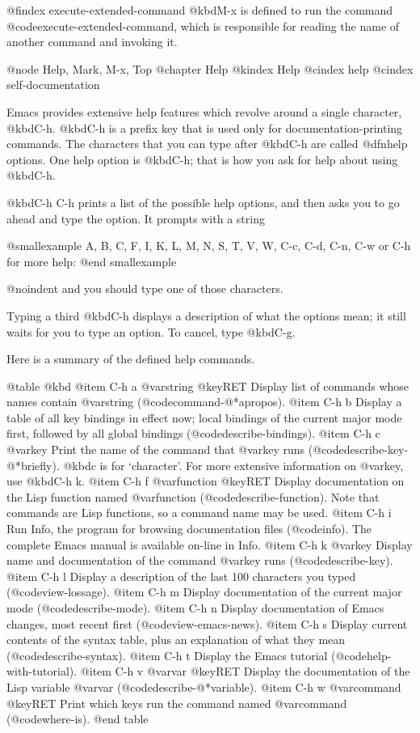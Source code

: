 {{{{{{@findex execute-extended-command
  @kbd{M-x} is defined to run the command @code{execute-extended-command},
which is responsible for reading the name of another command and invoking
it.

@node Help, Mark, M-x, Top
@chapter Help
@kindex Help
@cindex help
@cindex self-documentation

  Emacs provides extensive help features which revolve around a single
character, @kbd{C-h}.  @kbd{C-h} is a prefix key that is used only for
documentation-printing commands.  The characters that you can type after
@kbd{C-h} are called @dfn{help options}.  One help option is @kbd{C-h};
that is how you ask for help about using @kbd{C-h}.

  @kbd{C-h C-h} prints a list of the possible help options, and then asks
you to go ahead and type the option.  It prompts with a string

@smallexample
A, B, C, F, I, K, L, M, N, S, T, V, W, C-c, C-d, C-n, C-w or C-h for more help:
@end smallexample

@noindent
and you should type one of those characters.

  Typing a third @kbd{C-h} displays a description of what the options mean;
it still waits for you to type an option.  To cancel, type @kbd{C-g}.

  Here is a summary of the defined help commands.

@table @kbd
@item C-h a @var{string} @key{RET}
Display list of commands whose names contain @var{string}
(@code{command-@*apropos}).
@item C-h b
Display a table of all key bindings in effect now; local bindings of
the current major mode first, followed by all global bindings
(@code{describe-bindings}).
@item C-h c @var{key}
Print the name of the command that @var{key} runs (@code{describe-key-@*briefly}).
@kbd{c} is for `character'.  For more extensive information on @var{key},
use @kbd{C-h k}.
@item C-h f @var{function} @key{RET}
Display documentation on the Lisp function named @var{function}
(@code{describe-function}).  Note that commands are Lisp functions, so
a command name may be used.
@item C-h i
Run Info, the program for browsing documentation files (@code{info}).
The complete Emacs manual is available on-line in Info.
@item C-h k @var{key}
Display name and documentation of the command @var{key} runs (@code{describe-key}).
@item C-h l
Display a description of the last 100 characters you typed
(@code{view-lossage}).
@item C-h m
Display documentation of the current major mode (@code{describe-mode}).
@item C-h n
Display documentation of Emacs changes, most recent first
(@code{view-emacs-news}).
@item C-h s
Display current contents of the syntax table, plus an explanation of
what they mean (@code{describe-syntax}).
@item C-h t
Display the Emacs tutorial (@code{help-with-tutorial}).
@item C-h v @var{var} @key{RET}
Display the documentation of the Lisp variable @var{var}
(@code{describe-@*variable}).
@item C-h w @var{command} @key{RET}
Print which keys run the command named @var{command} (@code{where-is}).
@end table

}}}}}}
